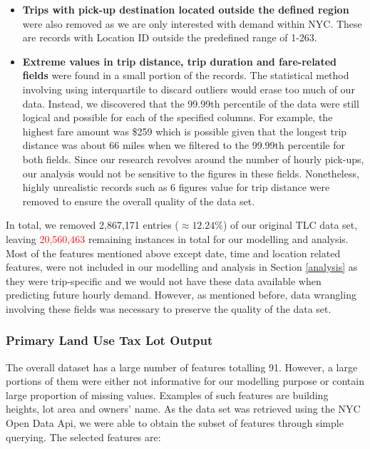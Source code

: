 \documentclass[11pt]{article}
\begin{document}
\begin{itemize}
\item \textbf{Trips with pick-up destination located outside the defined region} were also removed as we are only interested with demand within NYC. These are records with Location ID outside the predefined range of 1-263.

\item \textbf{Extreme values in trip distance, trip duration and fare-related fields} were found in a small portion of the records. The statistical method involving using interquartile to discard outliers would erase too much of our data. Instead, we discovered that the 99.99th percentile of the data were still logical and possible for each of the specified columns. For example, the highest fare amount was \$259 which is possible given that the longest trip distance was about 66 miles when we filtered to the 99.99th percentile for both fields. Since our research revolves around the number of hourly pick-ups, our analysis would not be sensitive to the figures in these fields. Nonetheless, highly unrealistic records such as 6 figures value for trip distance were removed to ensure the overall quality of the data set.
\end{itemize}

In total, we removed 2,867,171 entries ($\approx12.24\%$) of our original TLC data set, leaving \textcolor{red}{20,560,463} remaining instances in total for our modelling and analysis. Most of the features mentioned above except date, time and location related features, were not included in our modelling and analysis in Section \ref{analysis} as they were trip-specific and we would not have these data available when predicting future hourly demand. However, as mentioned before, data wrangling involving these fields was necessary to preserve the quality of the data set.



\subsubsection{Primary Land Use Tax Lot Output}
The overall dataset has a large number of features totalling 91. However, a large portions of them were either not informative for our modelling purpose or contain large proportion of missing values. Examples of such features are building heights, lot area and owners' name. As the data set was retrieved using the NYC Open Data Api, we were able to obtain the subset of features through simple querying. The selected features are:
\end{document}

